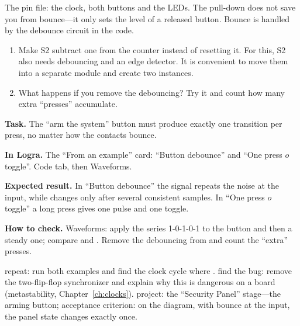 
The pin file: the clock, both buttons and the LEDs. The  pull-down
does not save you from bounce---it only sets the level of a released button.
Bounce is handled by the debounce circuit in the code.


\begin{taskbox}
\begin{enumerate}
  \item Make S2 subtract one from the counter instead of resetting it. For this,
        S2 also needs debouncing and an edge detector. It is convenient to move them
        into a separate  module and create two instances.
  \item What happens if you remove the debouncing? Try it and count how many
        extra ``presses'' accumulate.
\end{enumerate}
\end{taskbox}

\begin{diybox}
\textbf{Task.} The ``arm the system'' button must produce exactly one transition per press, no matter how the contacts bounce.

\textbf{In Logra.} The ``From an example'' card: ``Button debounce'' and ``One press $	o$ toggle''. Code tab, then Waveforms.

\textbf{Expected result.} In ``Button debounce'' the  signal repeats the noise at the input, while  changes only after several consistent samples. In ``One press $	o$ toggle'' a long press gives one  pulse and one toggle.

\textbf{How to check.} Waveforms: apply the series 1-0-1-0-1 to the button and then a steady one; compare  and . Remove the debouncing from  and count the ``extra'' presses.

 repeat: run both examples and find the clock cycle where .  find the bug: remove the two-flip-flop synchronizer and explain why this is dangerous on a board (metastability, Chapter~\ref{ch:clocks}).  project: the ``Security Panel'' stage---the arming button; acceptance criterion: on the diagram, with bounce at the input, the panel state changes exactly once.
\end{diybox}

